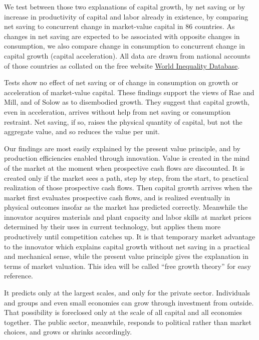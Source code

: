 We test between those two explanations of capital growth, by net
saving or by increase in productivity of capital and labor already
in existence, by comparing net saving to concurrent change in
market-value capital in 86 countries. As changes in net saving
are expected to be associated with opposite changes in consumption, we
also compare change in consumption to concurrent change in capital
growth (capital acceleration). All data are drawn from national accounts
of those countries as collated on the free website \href{https://wid.world/}{World Inequality Database}.

Tests show no effect of net saving or of change in consumption on
growth or acceleration of market-value capital. These findings support
the views of Rae and Mill, and of Solow as to disembodied growth. They
suggest that capital growth, even in acceleration, arrives without help
from net saving or consumption restraint. Net saving, if so,
raises the physical quantity of capital, but not the aggregate value,
and so reduces the value per unit.

Our findings are most easily explained by the present value principle,
and by production efficiencies enabled through innovation. Value is
created in the mind of the market at the moment when prospective cash
flows are discounted. It is created only if the market sees a path, step
by step, from the start, to practical realization of those prospective
cash flows. Then capital growth arrives when the market first evaluates
prospective cash flows, and is realized eventually in physical outcomes
insofar as the market has predicted correctly. Meanwhile the innovator
acquires materials and plant capacity and labor skills at market prices
determined by their uses in current technology, but applies them more
productively until competition catches up. It is that temporary market
advantage to the innovator which explains capital growth without net
saving in a practical and mechanical sense, while the present value
principle gives the explanation in terms of market valuation. This idea
will be called ``free growth theory'' for easy reference.

It predicts only at the largest scales, and only for the private sector.
Individuals and groups and even small economies can grow through
investment from outside. That possibility is foreclosed only at the
scale of all capital and all economies together. The public sector,
meanwhile, responds to political rather than market choices, and grows
or shrinks accordingly.

